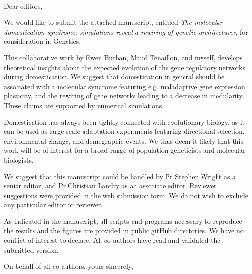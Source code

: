 \documentclass[12pt]{lettre}
\begin{document}

\begin{letter}{~}

\nodate
\nolieu

\def\concname{Subject:~}

\opening{Dear editors, }


We would like to submit the attached manuscript, entitled \emph{The molecular domestication syndrome: simulations reveal a rewiring of genetic architectures}, for consideration in Genetics. 

This collaborative work by Ewen Burban, Maud Tenaillon, and myself, develops theoretical insights about the expected evolution of the gene regulatory networks during domestication. We suggest that domestication in general should be associated with a molecular syndrome featuring e.g. maladaptive gene expression plasticity, and the rewiring of gene networks leading to a decrease in modularity. These claims are supported by numerical simulations. 

Domestication has always been tightly connected with evolutionary biology, as it can be used as large-scale adaptation experiments featuring directional selection, environmental change, and demographic events.  We thus deem it likely that this work will be of interest for a broad range of population geneticists and molecular biologists. 

We suggest that this manuscript could be handled by Pr Stephen Wright as a senior editor, and Pr Christian Landry as an associate editor. Reviewer suggestions were provided in the web submission form. We do not wish to exclude any particular editor or reviewer. 

As indicated in the manuscript, all scripts and programs necessary to reproduce the results and the figures are provided in public gitHub directories. We have no conflict of interest to declare. All co-authors have read and validated the submitted version. 

\closing{On behalf of all co-authors, yours sincerely,}

\end{letter}
\end{document}

